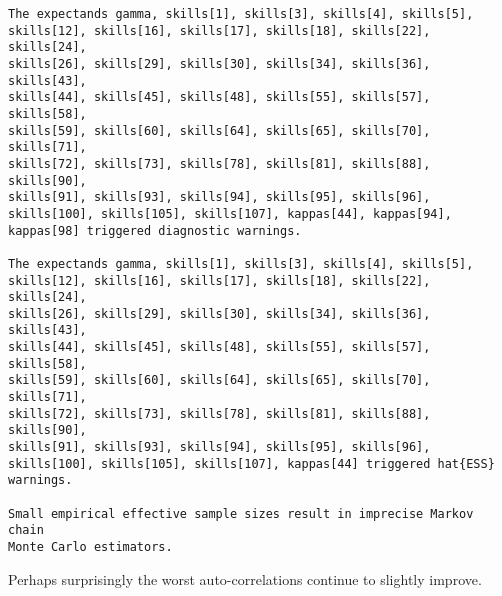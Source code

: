 \documentclass[
  letterpaper,
  DIV=11,
  numbers=noendperiod]{scrartcl}
\newenvironment{Shaded}{\begin{snugshade}}{\end{snugshade}}
\newcommand{\AttributeTok}[1]{\textcolor[rgb]{0.40,0.45,0.13}{#1}}
\newcommand{\DecValTok}[1]{\textcolor[rgb]{0.68,0.00,0.00}{#1}}
\newcommand{\FunctionTok}[1]{\textcolor[rgb]{0.28,0.35,0.67}{#1}}
\newcommand{\NormalTok}[1]{\textcolor[rgb]{0.00,0.23,0.31}{#1}}
\newcommand{\OtherTok}[1]{\textcolor[rgb]{0.00,0.23,0.31}{#1}}
\newcommand{\SpecialCharTok}[1]{\textcolor[rgb]{0.37,0.37,0.37}{#1}}
\newcommand{\StringTok}[1]{\textcolor[rgb]{0.13,0.47,0.30}{#1}}
\begin{document}
\begin{verbatim}
The expectands gamma, skills[1], skills[3], skills[4], skills[5],
skills[12], skills[16], skills[17], skills[18], skills[22], skills[24],
skills[26], skills[29], skills[30], skills[34], skills[36], skills[43],
skills[44], skills[45], skills[48], skills[55], skills[57], skills[58],
skills[59], skills[60], skills[64], skills[65], skills[70], skills[71],
skills[72], skills[73], skills[78], skills[81], skills[88], skills[90],
skills[91], skills[93], skills[94], skills[95], skills[96],
skills[100], skills[105], skills[107], kappas[44], kappas[94],
kappas[98] triggered diagnostic warnings.

The expectands gamma, skills[1], skills[3], skills[4], skills[5],
skills[12], skills[16], skills[17], skills[18], skills[22], skills[24],
skills[26], skills[29], skills[30], skills[34], skills[36], skills[43],
skills[44], skills[45], skills[48], skills[55], skills[57], skills[58],
skills[59], skills[60], skills[64], skills[65], skills[70], skills[71],
skills[72], skills[73], skills[78], skills[81], skills[88], skills[90],
skills[91], skills[93], skills[94], skills[95], skills[96],
skills[100], skills[105], skills[107], kappas[44] triggered hat{ESS}
warnings.

Small empirical effective sample sizes result in imprecise Markov chain
Monte Carlo estimators.
\end{verbatim}

Perhaps surprisingly the worst auto-correlations continue to slightly
improve.

\begin{Shaded}
\end{Shaded}
\end{document}
